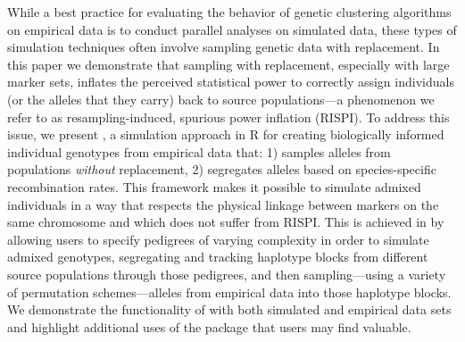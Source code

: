 

While a best practice for evaluating the behavior of genetic clustering algorithms 
on empirical data is to conduct parallel analyses on simulated data, these types 
of simulation techniques often involve sampling genetic data with replacement. 
In this paper we demonstrate that sampling with replacement, especially with large 
marker sets, inflates the perceived statistical power to correctly assign individuals
(or the alleles that they carry)
back to source populations---a phenomenon we refer to as resampling-induced, 
spurious power inflation (RISPI). To address this issue, we present \gscramble{}, a 
simulation approach in R for creating biologically informed individual genotypes from 
empirical data that: 1) samples alleles from populations \textit{without} replacement, 
2) segregates alleles based on species-specific recombination rates. This framework
makes it possible to simulate admixed individuals in a way that respects the physical
linkage between markers on the same chromosome and which does not suffer
from RISPI.  This is achieved in \gscramble{} by allowing 
users to specify pedigrees of varying complexity 
in order to simulate admixed genotypes, segregating and tracking haplotype blocks 
from different source populations through those pedigrees, and then sampling---using
a variety of permutation schemes---alleles from empirical data into those haplotype blocks.
We demonstrate the functionality of 
\gscramble{} with both simulated and empirical data sets and highlight additional uses of 
the package that users may find valuable.